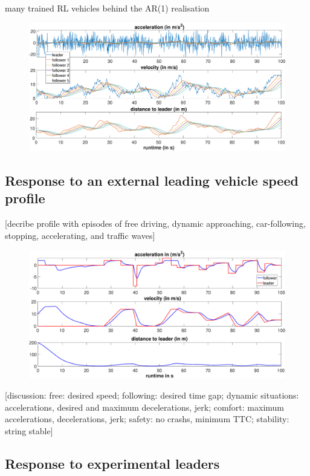 \documentclass[review]{elsarticle}
\begin{document}
many trained RL vehicles behind the AR(1) realisation

\begin{figure}
	\centering
	\includegraphics[width=12cm]{images/AR1Kolonne}
	\caption{}
	\label{fig:AR1Kolonne}
\end{figure}

\subsection{Response to an external leading vehicle speed profile}

[decribe profile with episodes of free driving, dynamic approaching,
  car-following, stopping, accelerating, and traffic waves]

\begin{figure}
	\centering
	\includegraphics[width=12cm]{images/manipulatedLeader.eps}
	\caption{}
	\label{fig:manipulatedLeader}
\end{figure}

[discussion: free: desired speed; following: desired time gap; dynamic
  situations: accelerations, desired and maximum  decelerations, jerk;
comfort: maximum accelerations, decelerations, jerk;
  safety: no crashs, minimum TTC; stability: string stable]


\subsection{Response to experimental leaders}
\end{document}
